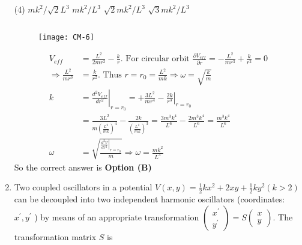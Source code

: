 \begin{enumerate}
\begin{tasks}(4)
	\task[\textbf{A.}] $m k^{2} / \sqrt{2} L^{3}$
	\task[\textbf{B.}] $m k^{2} / L^{3}$
	\task[\textbf{C.}] $\sqrt{2} m k^{2} / L^{3}$
	\task[\textbf{D.}] $\sqrt{3} m k^{2} / L^{3}$
\end{tasks}
\begin{answer}$\left. \right. $
	\begin{figure}[H]
		\centering
		\texttt{[image: CM-6]}
	\end{figure}
	\begin{align*}
	V_{e f f}&=\frac{L^{2}}{2 m r^{2}}-\frac{k}{r} .\text{ For circular orbit }\frac{\partial V_{e f f}}{\partial r}=-\frac{L^{2}}{m r^{3}}+\frac{k}{r^{2}}=0\\
	\Rightarrow \frac{L^{2}}{m r^{3}}&=\frac{k}{r^{2}} .\text{ Thus }r=r_{0}=\frac{L^{2}}{m k} \Rightarrow \omega=\sqrt{\frac{k}{m}}\\
	k&=\left.\frac{d^{2} V_{e f f}}{d r^{2}}\right|_{r=r_{0}}=+\frac{3 L^{2}}{m r^{4}}-\left.\frac{2 k}{r^{3}}\right|_{r=r_{0}}\\&=\frac{3 L^{2}}{m\left(\frac{L^{2}}{m k}\right)^{4}}-\frac{2 k}{\left(\frac{L^{2}}{m k}\right)^{3}}=\frac{3 m^{3} k^{4}}{L^{6}}-\frac{2 m^{3} k^{4}}{L^{6}}=\frac{m^{3} k^{4}}{L^{6}}\\
	\omega&=\sqrt{\frac{\left.\frac{d^{2} V}{d r^{2}}\right|_{r=r_{0}}}{m}} \Rightarrow \omega=\frac{m k^{2}}{L^{3}}
	\end{align*}
	So the correct answer is \textbf{Option (B)}
\end{answer}	
	\item Two coupled oscillators in a potential $V(x, y)=\frac{1}{2} k x^{2}+2 x y+\frac{1}{2} k y^{2}(k>2)$ can be decoupled into two independent harmonic oscillators (coordinates: $x^{\prime}, y^{\prime}$ ) by means of an appropriate transformation $\left(\begin{array}{c}x^{\prime} \\ y^{\prime}\end{array}\right)=S\left(\begin{array}{l}x \\ y\end{array}\right) .$ The transformation matrix $S$ is


\end{enumerate}
